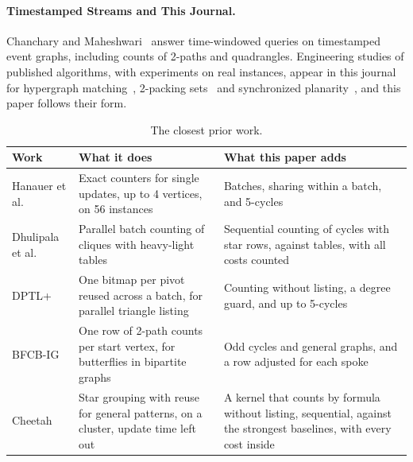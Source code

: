 \paragraph{Timestamped Streams and This Journal.}
Chanchary and Maheshwari~\cite{chanchary-windowed} answer time-windowed queries on timestamped event graphs, including counts of 2-paths and quadrangles.
Engineering studies of published algorithms, with experiments on real instances, appear in this journal for hypergraph matching~\cite{grossmann-bmatching}, 2-packing sets~\cite{borowitz-2packing} and synchronized planarity~\cite{fink-rutter}, and this paper follows their form.

\begin{table}[t]
  \centering
  \small
  \begin{tabular}{>{\raggedright\arraybackslash}p{2.6cm}>{\raggedright\arraybackslash}p{4.9cm}>{\raggedright\arraybackslash}p{4.9cm}}
    \hline
    Work & What it does & What this paper adds \\
    \hline
    Hanauer et al.~\cite{hanauer-dyncount} & Exact counters for single updates, up to 4 vertices, on 56 instances & Batches, sharing within a batch, and 5-cycles \\
    Dhulipala et al.~\cite{dhulipala-batch-kclique} & Parallel batch counting of cliques with heavy-light tables & Sequential counting of cycles with star rows, against tables, with all costs counted \\
    DPTL+~\cite{dptl} & One bitmap per pivot reused across a batch, for parallel triangle listing & Counting without listing, a degree guard, and up to 5-cycles \\
    BFCB-IG~\cite{bfcb} & One row of 2-path counts per start vertex, for butterflies in bipartite graphs & Odd cycles and general graphs, and a row adjusted for each spoke \\
    Cheetah~\cite{cheetah} & Star grouping with reuse for general patterns, on a cluster, update time left out & A kernel that counts by formula without listing, sequential, against the strongest baselines, with every cost inside \\
    \hline
  \end{tabular}
  \caption{The closest prior work.}
  \label{tab:closest}
\end{table}
